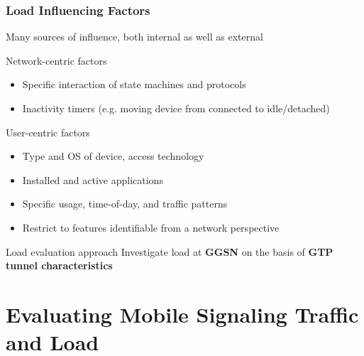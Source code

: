 \documentclass{beamer}
\begin{document}
\begin{frame}
	\frametitle{Load Influencing Factors}
	Many sources of influence, both internal as well as external

	Network-centric factors
	\begin{itemize}
		\item Specific interaction of state machines and protocols
		\item Inactivity timers (e.g. moving device from connected to idle/detached)
	\end{itemize}

	\vspace{0.3cm}
	
	User-centric factors
	\begin{itemize}
		\item Type and OS of device, access technology
		\item Installed and active applications
		\item Specific usage, time-of-day, and traffic patterns
		\item Restrict to features identifiable from a network perspective
	\end{itemize}

	\vspace{0.3cm}

	\pause
	\begin{block}{Load evaluation approach}
		Investigate load at \textbf{GGSN} on the basis of \textbf{GTP tunnel characteristics}
	\end{block}

\end{frame}




\section{Evaluating Mobile Signaling Traffic and Load}
\end{document}
